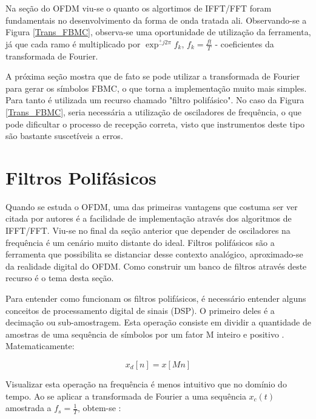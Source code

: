 \par Na seção do OFDM viu-se o quanto os algortimos de IFFT/FFT foram fundamentais no desenvolvimento da forma de onda tratada ali. Observando-se a Figura \ref{Trans_FBMC}, observa-se uma oportunidade de utilização da ferramenta, já que cada ramo é multiplicado por $\exp^{^{+}_{-} j2\pi}{f_{k}}$, $f_{k} = \frac{ft}{T}$ - coeficientes da transformada de Fourier. 

\par A próxima seção mostra que de fato se pode utilizar a transformada de Fourier para gerar os símbolos FBMC, o que torna a implementação muito mais simples. Para tanto é utilizada um recurso chamado "filtro polifásico". No caso da Figura \ref{Trans_FBMC}, seria necessária a utilização de osciladores de frequência, o que pode dificultar o processo de recepção correta, visto que instrumentos deste tipo são bastante suscetíveis a erros. 

\section{Filtros Polifásicos}

\par Quando se estuda o OFDM, uma das primeiras vantagens que costuma ser ver citada por autores é a facilidade de implementação através dos algoritmos de IFFT/FFT. Viu-se no final da seção anterior que depender de osciladores na frequência é um cenário muito distante do ideal. Filtros polifásicos são a ferramenta que possibilita se distanciar desse contexto analógico, aproximado-se da realidade digital do OFDM. Como construir um banco de filtros através deste recurso é o tema desta seção. 

\par Para entender como funcionam os filtros polifásicos, é necessário entender alguns conceitos de processamento digital de sinais (DSP). O primeiro deles é a decimação ou sub-amostragem. Esta operação consiste em dividir a quantidade de amostras de uma sequência de símbolos por um fator M inteiro e positivo \cite{Krishna}. Matematicamente:

\begin{equation}\label{downsampling}
x_{d}[n] = x[Mn] 
\end{equation}

Visualizar esta operação na frequência é menos intuitivo que no domínio do tempo. Ao se aplicar a transformada de Fourier a uma sequência $x_{c}(t)$ amostrada a $f_{s} = \frac{1}{T}$, obtem-se \cite{Krishna}:


